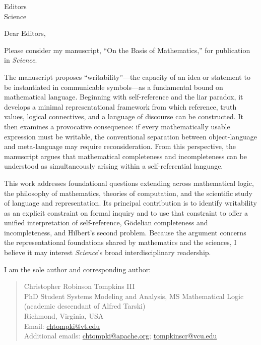 \documentclass[11pt]{letter}
\begin{document}
    \begin{letter}{Editors\\Science}

        \date{August 7, 2026}
        \opening{Dear Editors,}

        Please consider my manuscript, ``On the Basis of Mathematics,'' for
        publication in \textit{Science}.

        The manuscript proposes ``writability''---the capacity of an idea or
        statement to be instantiated in communicable symbols---as a fundamental
        bound on mathematical language. Beginning with self-reference and the liar
        paradox, it develops a minimal representational framework from which
        reference, truth values, logical connectives, and a language of discourse can
        be constructed. It then examines a provocative consequence: if every
        mathematically usable expression must be writable, the conventional
        separation between object-language and meta-language may require
        reconsideration. From this perspective, the manuscript argues that
        mathematical completeness and incompleteness can be understood as
        simultaneously arising within a self-referential language.

        This work addresses foundational questions extending across mathematical
        logic, the philosophy of mathematics, theories of computation, and the
        scientific study of language and representation. Its principal contribution
        is to identify writability as an explicit constraint on formal inquiry and to
        use that constraint to offer a unified interpretation of self-reference,
        G\"odelian completeness and incompleteness, and Hilbert's second problem.
        Because the argument concerns the representational foundations shared by
        mathematics and the sciences, I believe it may interest \textit{Science}'s
        broad interdisciplinary readership.

        I am the sole author and corresponding author:

        \begin{quote}
            Christopher Robinson Tompkins III\\
            PhD Student Systems Modeling and Analysis, MS Mathematical Logic (academic descendant of Alfred Tarski)\\
            Richmond, Virginia, USA\\
            Email: \href{mailto:chtompki@vt.edu}{chtompki@vt.edu}\\
            Additional emails: \href{mailto:chtompki@apache.org}{chtompki@apache.org};
            \href{mailto:tompkinscr@vcu.edu}{tompkinscr@vcu.edu}
        \end{quote}


\end{letter}
\end{document}

